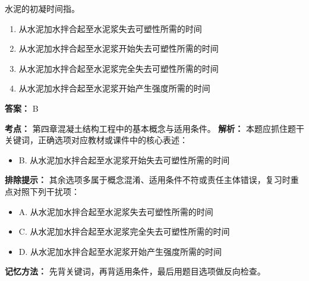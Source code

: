 \documentclass[UTF8,fontset=fandol,11pt]{ctexart}
\begin{document}
\begin{quizbox}[title={第 33 题}]
水泥的初凝时间指。\\
\begin{enumerate}[label=\Alph*.]
\item 从水泥加水拌合起至水泥浆失去可塑性所需的时间
\item 从水泥加水拌合起至水泥浆开始失去可塑性所需的时间
\item 从水泥加水拌合起至水泥浆完全失去可塑性所需的时间
\item 从水泥加水拌合起至水泥浆开始产生强度所需的时间
\end{enumerate}
\textbf{答案：} B
\vspace{0.25em}
\begin{answerbox}[title={考点解析}]
\textbf{考点：} 第四章混凝土结构工程中的基本概念与适用条件。
\textbf{解析：} 本题应抓住题干关键词，正确选项对应教材或课件中的核心表述：
\begin{itemize}
\item B. 从水泥加水拌合起至水泥浆开始失去可塑性所需的时间
\end{itemize}
\textbf{排除提示：} 其余选项多属于概念混淆、适用条件不符或责任主体错误，复习时重点对照下列干扰项：
\begin{itemize}
\item A. 从水泥加水拌合起至水泥浆失去可塑性所需的时间
\item C. 从水泥加水拌合起至水泥浆完全失去可塑性所需的时间
\item D. 从水泥加水拌合起至水泥浆开始产生强度所需的时间
\end{itemize}
\textbf{记忆方法：} 先背关键词，再背适用条件，最后用题目选项做反向检查。
\end{answerbox}
\end{quizbox}

\vspace{0.2em}
\end{document}
